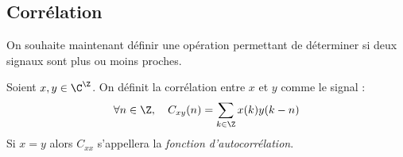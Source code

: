 

        




        

\subsection{Corrélation}

On souhaite maintenant définir une opération permettant de déterminer si deux signaux sont 
plus ou moins proches. 

\begin{definition}
    Soient $x,y \in \C^\Z$. On définit la corrélation entre $x$ et $y$ comme le signal : 
        \begin{equation}
            \forall n \in \Z, \quad C_{xy}(n) = \sum_{k \in \Z} x(k) y(k - n) 
        \end{equation}
    Si $x = y$ alors $ C_{xx}$ s'appellera la \emph{fonction d'autocorrélation}. 
\end{definition}

